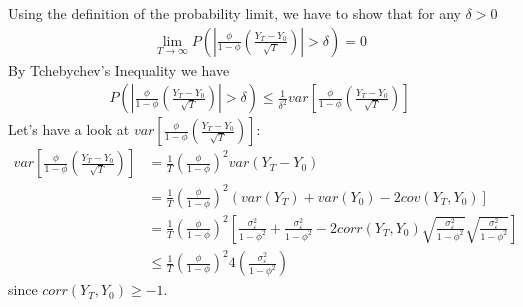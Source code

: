\begin{enumerate}
\begin{enumerate}
                    \begin{solution}
                        Using the definition of the probability limit, we have to show that for any $\delta>0$
                        \begin{align*}
                            \lim_{T\rightarrow \infty} P\left(\left|\frac{\phi}{1-\phi}\left(\frac{Y_T - Y_0}{\sqrt{T}}\right)\right|> \delta\right) = 0
                        \end{align*}
                        By Tchebychev's Inequality we have
                        \begin{align*}
                            P\left(\left|\frac{\phi}{1-\phi}\left(\frac{Y_T - Y_0}{\sqrt{T}}\right)\right|> \delta\right) \leq \frac{1}{\delta^2} var\left[\frac{\phi}{1-\phi}\left(\frac{Y_T - Y_0}{\sqrt{T}}\right)\right]
                        \end{align*}
                        Let's have a look at $var\left[\frac{\phi}{1-\phi}\left(\frac{Y_T - Y_0}{\sqrt{T}}\right)\right]$:
                        \begin{align*}
                            var\left[\frac{\phi}{1-\phi}\left(\frac{Y_T - Y_0}{\sqrt{T}}\right)\right]
                             & = \frac{1}{T}\left(\frac{\phi}{1-\phi}\right)^2 var(Y_T - Y_0)                                                                                                                                                                                        \\
                             & = \frac{1}{T}\left(\frac{\phi}{1-\phi}\right)^2 \left(var(Y_T) + var(Y_0) - 2 cov(Y_T,Y_0)\right]                                                                                                                                                     \\
                             & = \frac{1}{T}\left(\frac{\phi}{1-\phi}\right)^2 \left[\frac{\sigma_\varepsilon^2}{1-\phi^2} + \frac{\sigma_\varepsilon^2}{1-\phi^2} - 2 corr(Y_T,Y_0)\sqrt{\frac{\sigma_\varepsilon^2}{1-\phi^2}}\sqrt{\frac{\sigma_\varepsilon^2}{1-\phi^2}} \right] \\
                             & \leq \frac{1}{T}\left(\frac{\phi}{1-\phi}\right)^2 4 \left(\frac{\sigma_\varepsilon^2}{1-\phi^2}\right)
                        \end{align*}
                        since $corr(Y_T,Y_0) \geq -1$.


\end{solution}
\end{enumerate}
\end{enumerate}
